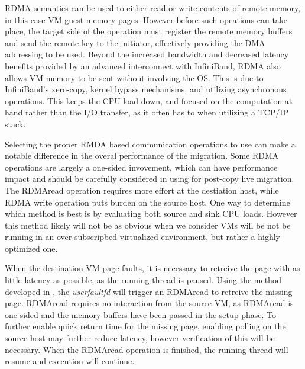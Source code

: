 RDMA semantics can be used to either read or write contents of remote memory, in this case VM guest memory pages. However before such opeations can take place, the target side of the operation must register the remote memory buffers and send the remote key to the initiator, effectively providing the DMA addressing to be used. Beyond the increased bandwidth and decreased latency benefits provided by an advanced interconnect with InfiniBand, RDMA also allows VM memory to be sent without involving the OS. This is due to InfiniBand's xero-copy, kernel bypass mechanisms, and utilizing asynchronous operations. This keeps the CPU load down, and focused on the computation at hand rather than the I/O transfer, as it often has to when utilizing a TCP/IP stack. 
 
Selecting the proper RMDA based communication operations to use can make a notable difference in the overal performance of the migration.  
Some RDMA operations are largely a one-sided invovement, which can have performance impact and should be carefully considered in using for post-copy live migration. The RDMAread operation requires more effort at the destiation host, while RDMA write operation puts burden on the source host.  One way to determine which method is best is by evaluating both source and sink CPU loads.  However this method likely will not be as obvious when we consider VMs will be not be running in an over-subscripbed virtualized environment, but rather a highly optimized one. 

When the destination VM page faults, it is necessary to retreive the page with as little latency as possible, as the running thread is paused. Using the method developed in \cite{www-kvm-postcopy}, the \emph{userfaultfd} will trigger an RDMAread to retreive the missing page. RDMAread requires no interaction from the source VM, as RDMAread is one sided and the memory buffers have been passed in the setup phase. To further enable quick return time for the missing page, enabling polling on the source host may further reduce latency, however verification of this will be necessary. When the RDMAread operation is finished, the running thread will resume and execution will continue.






